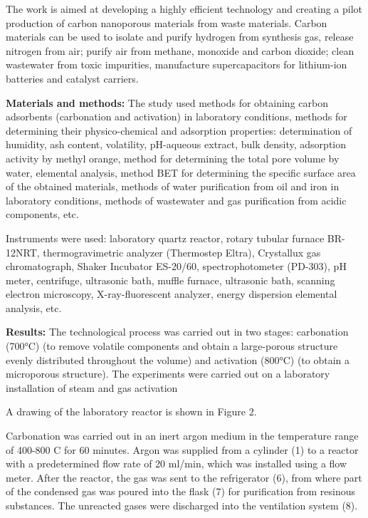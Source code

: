 \begin{multicols}{2}
The work is aimed at developing a highly efficient technology and
creating a pilot production of carbon nanoporous materials from waste
materials. Carbon materials can be used to isolate and purify hydrogen
from synthesis gas, release nitrogen from air; purify air from methane,
monoxide and carbon dioxide; clean wastewater from toxic impurities,
manufacture supercapacitors for lithium-ion batteries and catalyst
carriers.

{\bfseries Materials and methods:} The study used methods for obtaining
carbon adsorbents (carbonation and activation) in laboratory conditions,
methods for determining their physico-chemical and adsorption
properties: determination of humidity, ash content, volatility,
pH-aqueous extract, bulk density, adsorption activity by methyl orange,
method for determining the total pore volume by water, elemental
analysis, method BET for determining the specific surface area of the
obtained materials, methods of water purification from oil and iron in
laboratory conditions, methods of wastewater and gas purification from
acidic components, etc.

Instruments were used: laboratory quartz reactor, rotary tubular furnace
BR-12NRT, thermogravimetric analyzer (Thermostep Eltra), Crystallux gas
chromatograph, Shaker Incubator ES-20/60, spectrophotometer (PD-303), pH
meter, centrifuge, ultrasonic bath, muffle furnace, ultrasonic bath,
scanning electron microscopy, X-ray-fluorescent analyzer, energy
dispersion elemental analysis, etc.

{\bfseries Results:} The technological process was carried out in two
stages: carbonation (700°C) (to remove volatile components and obtain a
large-porous structure evenly distributed throughout the volume) and
activation (800°C) (to obtain a microporous structure). The experiments
were carried out on a laboratory installation of steam and gas
activation

A drawing of the laboratory reactor is shown in Figure 2.

Carbonation was carried out in an inert argon medium in the temperature
range of 400-800 C for 60 minutes. Argon was supplied from a cylinder
(1) to a reactor with a predetermined flow rate of 20 ml/min, which was
installed using a flow meter. After the reactor, the gas was sent to the
refrigerator (6), from where part of the condensed gas was poured into
the flask (7) for purification from resinous substances. The unreacted
gases were discharged into the ventilation system (8).


\end{multicols}
